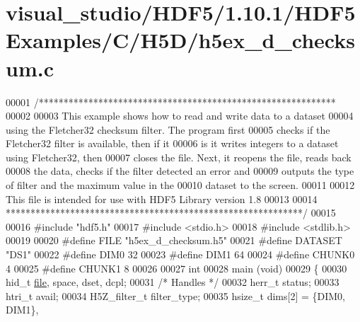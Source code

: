 \hypertarget{visual__studio_2_h_d_f5_21_810_81_2_h_d_f5_examples_2_c_2_h5_d_2h5ex__d__checksum_8c_source}{}\section{visual\+\_\+studio/\+H\+D\+F5/1.10.1/\+H\+D\+F5\+Examples/\+C/\+H5\+D/h5ex\+\_\+d\+\_\+checksum.c}
\label{visual__studio_2_h_d_f5_21_810_81_2_h_d_f5_examples_2_c_2_h5_d_2h5ex__d__checksum_8c_source}

\begin{DoxyCode}
00001 \textcolor{comment}{/************************************************************}
00002 \textcolor{comment}{}
00003 \textcolor{comment}{  This example shows how to read and write data to a dataset}
00004 \textcolor{comment}{  using the Fletcher32 checksum filter.  The program first}
00005 \textcolor{comment}{  checks if the Fletcher32 filter is available, then if it}
00006 \textcolor{comment}{  is it writes integers to a dataset using Fletcher32, then}
00007 \textcolor{comment}{  closes the file.  Next, it reopens the file, reads back}
00008 \textcolor{comment}{  the data, checks if the filter detected an error and}
00009 \textcolor{comment}{  outputs the type of filter and the maximum value in the}
00010 \textcolor{comment}{  dataset to the screen.}
00011 \textcolor{comment}{}
00012 \textcolor{comment}{  This file is intended for use with HDF5 Library version 1.8}
00013 \textcolor{comment}{}
00014 \textcolor{comment}{ ************************************************************/}
00015 
00016 \textcolor{preprocessor}{#include "hdf5.h"}
00017 \textcolor{preprocessor}{#include <stdio.h>}
00018 \textcolor{preprocessor}{#include <stdlib.h>}
00019 
00020 \textcolor{preprocessor}{#define FILE            "h5ex\_d\_checksum.h5"}
00021 \textcolor{preprocessor}{#define DATASET         "DS1"}
00022 \textcolor{preprocessor}{#define DIM0            32}
00023 \textcolor{preprocessor}{#define DIM1            64}
00024 \textcolor{preprocessor}{#define CHUNK0          4}
00025 \textcolor{preprocessor}{#define CHUNK1          8}
00026 
00027 \textcolor{keywordtype}{int}
00028 main (\textcolor{keywordtype}{void})
00029 \{
00030     hid\_t           \hyperlink{structfile}{file}, space, dset, dcpl;
00031                                                 \textcolor{comment}{/* Handles */}
00032     herr\_t          status;
00033     htri\_t          avail;
00034     H5Z\_filter\_t    filter\_type;
00035     hsize\_t         dims[2] = \{DIM0, DIM1\},

\end{DoxyCode}

